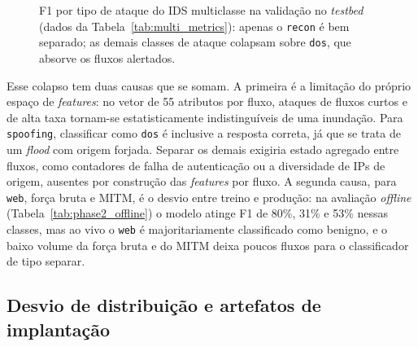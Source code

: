 \documentclass[12pt,a4paper]{article}
\begin{document}
\begin{figure}[ht]
\centering
{}
\caption{F1 por tipo de ataque do IDS multiclasse na validação no
\textit{testbed} (dados da Tabela~\ref{tab:multi_metrics}): apenas o \texttt{recon}
é bem separado; as demais classes de ataque colapsam sobre \texttt{dos}, que
absorve os fluxos alertados.}
\label{fig:multi_f1}
\end{figure}

Esse colapso tem duas causas que se somam. A primeira é a limitação do próprio
espaço de \textit{features}: no vetor de 55 atributos por fluxo, ataques de
fluxos curtos e de alta taxa tornam-se estatisticamente indistinguíveis de uma
inundação. Para \texttt{spoofing}, classificar como \texttt{dos} é inclusive a
resposta correta, já que se trata de um \textit{flood} com origem forjada.
Separar os demais exigiria estado agregado entre fluxos, como contadores de falha
de autenticação ou a diversidade de IPs de origem, ausentes por construção das
\textit{features} por fluxo. A segunda causa, para \texttt{web}, força bruta e
MITM, é o desvio entre treino e produção: na avaliação \textit{offline}
(Tabela~\ref{tab:phase2_offline}) o modelo atinge F1 de 80\%, 31\% e 53\% nessas
classes, mas ao vivo o \texttt{web} é majoritariamente classificado como benigno,
e o baixo volume da força bruta e do MITM deixa poucos fluxos para o
classificador de tipo separar.

\subsection{Desvio de distribuição e artefatos de implantação}
\label{subsec:res_artefatos}
\end{document}
